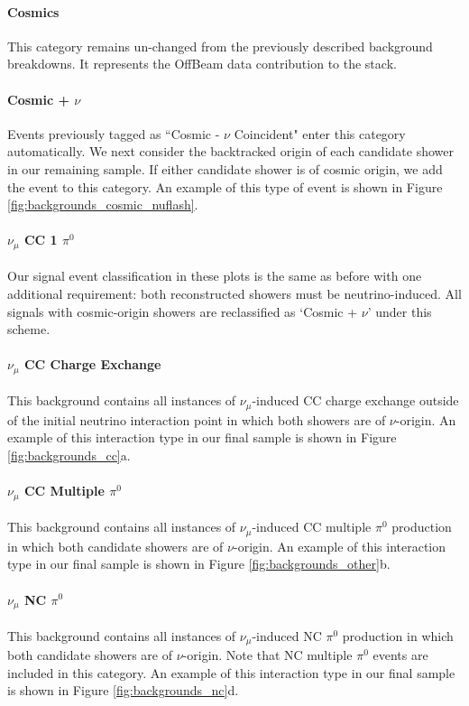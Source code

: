 \documentclass{article}
\begin{document}
\paragraph{ Cosmics}
This category remains un-changed from the previously described background breakdowns.  It represents the OffBeam data contribution to the stack. 

\paragraph{ Cosmic + $\nu$}
Events previously tagged as ``Cosmic - $\nu$ Coincident" enter this category automatically.  We next consider the backtracked origin of each candidate shower in our remaining sample.  If either candidate shower is of cosmic origin, we add the event to this category. An example of this type of event is shown in Figure \ref{fig:backgrounds_cosmic_nuflash}.

\paragraph{ $\nu_\mu$ CC 1 $\pi^0$ } Our signal event classification in these plots is the same as before with one additional requirement: both reconstructed showers must be neutrino-induced.  All signals with cosmic-origin showers are reclassified as `Cosmic + $\nu$' under this scheme.

\paragraph{$\nu_\mu$ CC Charge Exchange}
This background contains all instances of $\nu_\mu$-induced CC charge exchange outside of the initial neutrino interaction point in which both showers are of $\nu$-origin. An example of this interaction type in our final sample is shown in Figure \ref{fig:backgrounds_cc}a. 

\paragraph{$\nu_\mu$ CC Multiple $\pi^0$}
This background contains all instances of $\nu_\mu$-induced CC multiple $\pi^0$ production in which both candidate showers are of $\nu$-origin.  An example of this interaction type in our final sample is shown in Figure \ref{fig:backgrounds_other}b.

\paragraph{$\nu_\mu$ NC $\pi^0$}
This background contains all instances of $\nu_\mu$-induced NC $\pi^0$ production in which both candidate showers are of $\nu$-origin. Note that NC multiple $\pi^0$ events are included in this category.  An example of this interaction type in our final sample is shown in Figure \ref{fig:backgrounds_nc}d. 
\end{document}
